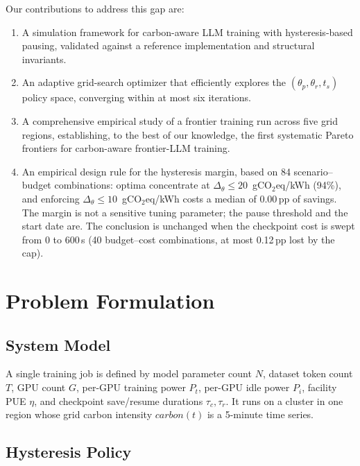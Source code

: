 \documentclass[runningheads]{llncs}
\begin{document}
Our contributions to address this gap are:
\begin{enumerate}
  \item A simulation framework for carbon-aware LLM training with
    hysteresis-based pausing, validated against a reference
    implementation and structural invariants.
  \item An adaptive grid-search optimizer that efficiently explores
    the $(\theta_p, \theta_r, t_s)$ policy space, converging within
    at most six iterations.
  \item A comprehensive empirical study of a frontier training run
    across five grid regions, establishing, to the best of our
    knowledge, the first systematic Pareto frontiers for carbon-aware
    frontier-LLM training.
  \item An empirical design rule for the hysteresis margin, based on
    84 scenario--budget combinations: optima concentrate at
    $\Delta_\theta \leq 20$~gCO$_2$eq/kWh (94\%), and enforcing
    $\Delta_\theta \leq 10$~gCO$_2$eq/kWh costs a median of 0.00\,pp
    of savings. The margin is not a sensitive tuning parameter; the
    pause threshold and the start date are. The conclusion is
    unchanged when the checkpoint cost is swept from 0 to 600\,s (40
    budget--cost combinations, at most 0.12\,pp lost by the cap).
\end{enumerate}

\section{Problem Formulation}

\subsection{System Model}

A single training job is defined by model parameter count $N$,
dataset token count $T$, GPU count $G$, per-GPU training power $P_t$,
per-GPU idle power $P_i$, facility PUE $\eta$, and checkpoint
save/resume durations $\tau_c, \tau_r$. It runs on a cluster in one
region whose grid carbon intensity $carbon(t)$ is a 5-minute time series.

\subsection{Hysteresis Policy}
\end{document}
